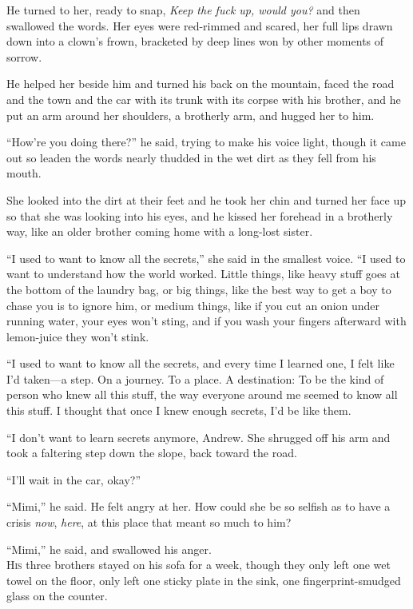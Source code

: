 \documentclass{article}
\begin{document}
He turned to her, ready to snap, \textit{Keep the fuck up, would you?}
and then swallowed the words.  Her eyes were red-rimmed and scared,
her full lips drawn down into a clown's frown, bracketed by deep lines
won by other moments of sorrow.

He helped her beside him and turned his back on the mountain, faced
the road and the town and the car with its trunk with its corpse with
his brother, and he put an arm around her shoulders, a brotherly arm,
and hugged her to him.

``How're you doing there?'' he said, trying to make his voice light,
though it came out so leaden the words nearly thudded in the wet dirt
as they fell from his mouth.

She looked into the dirt at their feet and he took her chin and turned
her face up so that she was looking into his eyes, and he kissed her
forehead in a brotherly way, like an older brother coming home with a
long-lost sister.

``I used to want to know all the secrets,'' she said in the smallest
voice.  ``I used to want to understand how the world worked.  Little
things, like heavy stuff goes at the bottom of the laundry bag, or big
things, like the best way to get a boy to chase you is to ignore him,
or medium things, like if you cut an onion under running water, your
eyes won't sting, and if you wash your fingers afterward with
lemon-juice they won't stink.

``I used to want to know all the secrets, and every time I learned
one, I felt like I'd taken---a step.  On a journey.  To a place.  A
destination:  To be the kind of person who knew all this stuff, the
way everyone around me seemed to know all this stuff.  I thought that
once I knew enough secrets, I'd be like them.

``I don't want to learn secrets anymore, Andrew.  She shrugged off his
arm and took a faltering step down the slope, back toward the road.

``I'll wait in the car, okay?''

``Mimi,'' he said.  He felt angry at her.  How could she be so selfish
as to have a crisis \textit{now}, \textit{here}, at this place that
meant so much to him?

``Mimi,'' he said, and swallowed his anger.
\\
\lettrine[lines=3, lhang=.5, nindent=0pt, findent=2pt]{H}{is} three brothers stayed on his sofa for a week, though they only
left one wet towel on the floor, only left one sticky plate in the
sink, one fingerprint-smudged glass on the counter.
\end{document}
